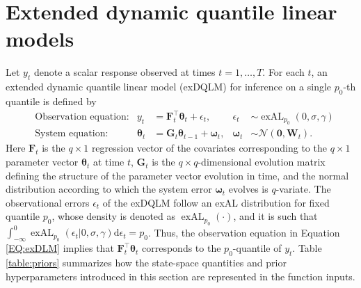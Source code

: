 \documentclass{jss}
\newcommand{\vect}[1]{\boldsymbol{#1}}
\newcommand{\mat}[1]{\mathbf{#1}}
\newcommand{\N}{\mathcal{N}}
\newcommand{\exAL}{\operatorname{exAL}}
\begin{document}
\section{Extended dynamic quantile linear models}
\label{sec:exdqlm}

Let \(y_t\) denote a scalar response observed at times \(t=1,\ldots,T\). For each $t$, an extended dynamic quantile linear model (exDQLM) for inference on a single $p_0$-th quantile is defined by
\begin{align}
\label{EQ:exDLM}
& \text{Observation equation:} & y_t &= \mat{F}_t^\top \vect{\theta}_t + \epsilon_t,  & \epsilon_t & \sim \exAL_{p_0}(0,\sigma,\gamma) \\
\label{EQ:exDLMevo}
& \text{System equation:} & \vect{\theta}_t &= \mat{G}_t \vect{\theta}_{t-1} + \vect{\omega}_t, & \vect{\omega}_t  & \sim \N(\mat{0},\mat{W}_t).
\end{align}
Here $\mat{F}_t$ is the $q \times 1$ regression vector of the covariates corresponding to the $q \times 1$ parameter vector $\vect{\theta}_t$ at time $t$, $\mat{G}_t$ is the $q\times q$-dimensional evolution matrix defining the structure of the parameter vector evolution in time, and the normal distribution according to which the system error $\vect{\omega}_t$ evolves is $q$-variate. The observational errors $\epsilon_t$ of the exDQLM follow an exAL distribution for fixed quantile $p_0$, whose density is denoted as $\exAL_{p_0}(\cdot)$, and it is such that $\int_{-\infty}^0 \exAL_{p_0}(\epsilon_t |0,\sigma,\gamma) \mathrm{d}\epsilon_t = p_0$. Thus, the observation equation in Equation \eqref{EQ:exDLM} implies that $\mat{F}_t^\top \vect{\theta}_t$ corresponds to the $p_0$-quantile of $y_t$. Table \ref{table:priors} summarizes how the state-space quantities and prior hyperparameters introduced in this section are represented in the  function inputs.
\end{document}
